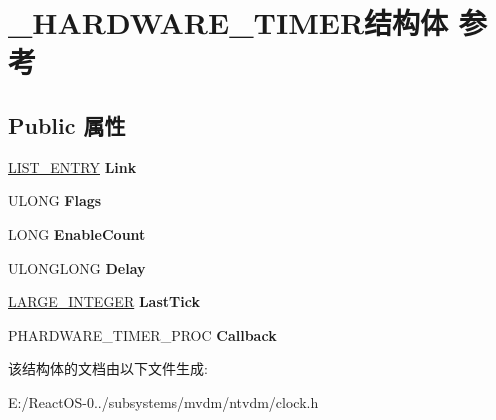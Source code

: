 \hypertarget{struct___h_a_r_d_w_a_r_e___t_i_m_e_r}{}\section{\+\_\+\+H\+A\+R\+D\+W\+A\+R\+E\+\_\+\+T\+I\+M\+E\+R结构体 参考}
\label{struct___h_a_r_d_w_a_r_e___t_i_m_e_r}
\subsection*{Public 属性}
\begin{DoxyCompactItemize}
\item 
\mbox{\label{struct___h_a_r_d_w_a_r_e___t_i_m_e_r_ae2ee70912aa780a4d33dabacd951be3a}} 
\hyperlink{struct___l_i_s_t___e_n_t_r_y}{L\+I\+S\+T\+\_\+\+E\+N\+T\+RY} {\bfseries Link}
\item 
\mbox{\label{struct___h_a_r_d_w_a_r_e___t_i_m_e_r_af35f3d6fa1b7295d2677af94cd9739e7}} 
U\+L\+O\+NG {\bfseries Flags}
\item 
\mbox{\label{struct___h_a_r_d_w_a_r_e___t_i_m_e_r_ad5f0f26a386f286b44a815d294eadc70}} 
L\+O\+NG {\bfseries Enable\+Count}
\item 
\mbox{\label{struct___h_a_r_d_w_a_r_e___t_i_m_e_r_aca7c39c6e24360f8a37b398be441f771}} 
U\+L\+O\+N\+G\+L\+O\+NG {\bfseries Delay}
\item 
\mbox{\label{struct___h_a_r_d_w_a_r_e___t_i_m_e_r_a531e63009ff7c37130f91b06ea53fbbc}} 
\hyperlink{union___l_a_r_g_e___i_n_t_e_g_e_r}{L\+A\+R\+G\+E\+\_\+\+I\+N\+T\+E\+G\+ER} {\bfseries Last\+Tick}
\item 
\mbox{\label{struct___h_a_r_d_w_a_r_e___t_i_m_e_r_a0b63d56c5320be09bdb935cdb5ef0fa3}} 
P\+H\+A\+R\+D\+W\+A\+R\+E\+\_\+\+T\+I\+M\+E\+R\+\_\+\+P\+R\+OC {\bfseries Callback}
\end{DoxyCompactItemize}


该结构体的文档由以下文件生成\+:\begin{DoxyCompactItemize}
\item 
E\+:/\+React\+O\+S-\/0../subsystems/mvdm/ntvdm/clock.\+h\end{DoxyCompactItemize}
